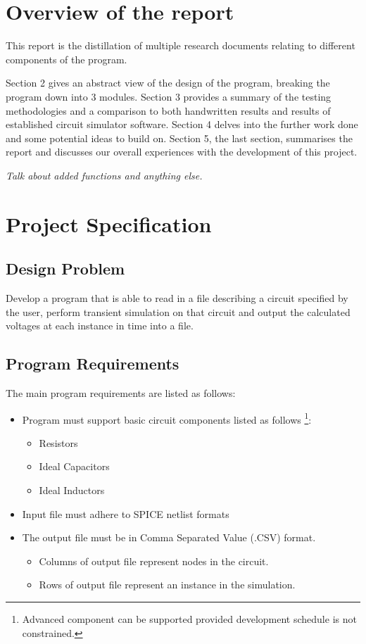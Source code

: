 \documentclass[12pt,a4paper]{article}
\begin{document}
\section{Overview of the report}
This report is the distillation of multiple research documents relating to different components of the program. \par
Section 2 gives an abstract view of the design of the program, breaking the program down into 3 modules.
Section 3 provides a summary of the testing methodologies and a comparison to both handwritten results and results of 
established circuit simulator software. 
Section 4 delves into the further work done and some potential ideas to build on.
Section 5, the last section, summarises the report and discusses our overall experiences with the development of this project.
\par
\textit{Talk about added functions and anything else.}
\pagebreak

\section{Project Specification}
	\subsection{Design Problem}
	Develop a program that is able to read in a file describing a circuit specified by the user, perform 
	transient simulation on that circuit and output the calculated voltages at each instance in time into a file. 
	\subsection{Program Requirements}
	The main program requirements are listed as follows:
	\begin{itemize}
		\item Program must support basic circuit components listed as follows \footnote{Advanced component can be supported
		provided development schedule is not constrained.}:
		\begin{itemize}
			\item Resistors
			\item Ideal Capacitors
			\item Ideal Inductors
		\end{itemize}
		\item Input file must adhere to SPICE netlist formats
		\item The output file must be in Comma Separated Value (.CSV) format.
		\begin{itemize}
			\item Columns of output file represent nodes in the circuit.
			\item Rows of output file represent an instance in the simulation.
		\end{itemize}
	\end{itemize}
	\vfill
	\pagebreak
\end{document}
